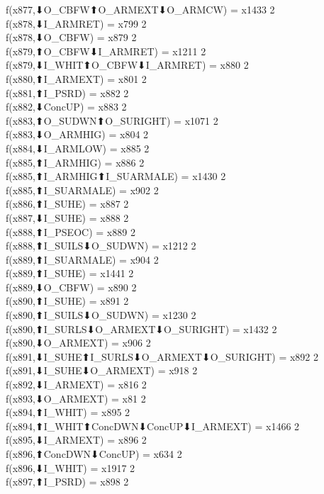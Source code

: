 f(x877,⬇O_CBFW⬆O_ARMEXT⬇O_ARMCW) = x1433 {2} \\
f(x878,⬇I_ARMRET) = x799 {2} \\
f(x878,⬇O_CBFW) = x879 {2} \\
f(x879,⬆O_CBFW⬇I_ARMRET) = x1211 {2} \\
f(x879,⬇I_WHIT⬆O_CBFW⬇I_ARMRET) = x880 {2} \\
f(x880,⬆I_ARMEXT) = x801 {2} \\
f(x881,⬆I_PSRD) = x882 {2} \\
f(x882,⬇ConcUP) = x883 {2} \\
f(x883,⬆O_SUDWN⬆O_SURIGHT) = x1071 {2} \\
f(x883,⬇O_ARMHIG) = x804 {2} \\
f(x884,⬇I_ARMLOW) = x885 {2} \\
f(x885,⬆I_ARMHIG) = x886 {2} \\
f(x885,⬆I_ARMHIG⬆I_SUARMALE) = x1430 {2} \\
f(x885,⬆I_SUARMALE) = x902 {2} \\
f(x886,⬆I_SUHE) = x887 {2} \\
f(x887,⬇I_SUHE) = x888 {2} \\
f(x888,⬆I_PSEOC) = x889 {2} \\
f(x888,⬆I_SUILS⬇O_SUDWN) = x1212 {2} \\
f(x889,⬆I_SUARMALE) = x904 {2} \\
f(x889,⬆I_SUHE) = x1441 {2} \\
f(x889,⬇O_CBFW) = x890 {2} \\
f(x890,⬆I_SUHE) = x891 {2} \\
f(x890,⬆I_SUILS⬇O_SUDWN) = x1230 {2} \\
f(x890,⬆I_SURLS⬇O_ARMEXT⬇O_SURIGHT) = x1432 {2} \\
f(x890,⬇O_ARMEXT) = x906 {2} \\
f(x891,⬇I_SUHE⬆I_SURLS⬇O_ARMEXT⬇O_SURIGHT) = x892 {2} \\
f(x891,⬇I_SUHE⬇O_ARMEXT) = x918 {2} \\
f(x892,⬇I_ARMEXT) = x816 {2} \\
f(x893,⬇O_ARMEXT) = x81 {2} \\
f(x894,⬆I_WHIT) = x895 {2} \\
f(x894,⬆I_WHIT⬆ConcDWN⬇ConcUP⬇I_ARMEXT) = x1466 {2} \\
f(x895,⬇I_ARMEXT) = x896 {2} \\
f(x896,⬆ConcDWN⬇ConcUP) = x634 {2} \\
f(x896,⬇I_WHIT) = x1917 {2} \\
f(x897,⬆I_PSRD) = x898 {2} \\
